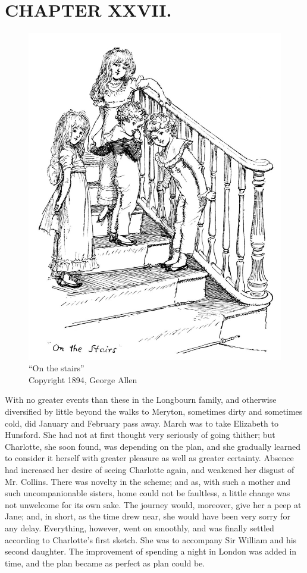 \chapter{CHAPTER XXVII.}

\begin{figure}[htbp]
    \centering
    \includegraphics[width=\textwidth]{illustrations/i_218_a.jpg}
    \caption{“On the stairs”\\ Copyright 1894, George Allen}
    \label{fig:image}
\end{figure}

With no greater events than these in the Longbourn family, and otherwise diversified by little beyond the walks to Meryton, sometimes dirty and sometimes cold, did January and February pass away. March was to take Elizabeth to Hunsford. She had not at first thought very seriously of going thither; but Charlotte, she soon found, was depending on the plan, and she gradually learned to consider it herself with greater pleasure as well as greater certainty. Absence had increased her desire of seeing Charlotte again, and weakened her disgust of Mr. Collins. There was novelty in the scheme; and as, with such a mother and such uncompanionable sisters, home could not be faultless, a little change was not unwelcome for its own sake. The journey would, moreover, give her a peep at Jane; and, in short, as the time drew near, she would have been very sorry for any delay. Everything, however, went on smoothly, and was finally settled according to Charlotte's first sketch. She was to accompany Sir William and his second daughter. The improvement of spending a night in London was added in time, and the plan became as perfect as plan could be.

